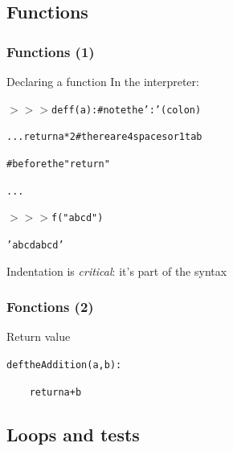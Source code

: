 \documentclass[xcolor=pdftex,dvipsnames,table,mathserif]{beamer}
\begin{document}
\subsection{Functions}

\begin{frame}
  \frametitle{Functions (1)}

  \begin{block}{Declaring a function}
    In the interpreter:
    \begin{alltt}
      $>>>$ def f(a):        \# note the ':' (colon)

      ...     return a*2   \# there are 4 spaces or 1 tab

      \#     before the "return"

      ...

      $>>>$ f("abcd")

      'abcdabcd'

    \end{alltt}
    Indentation is \emph{critical}: it's part of the syntax
  \end{block}

\end{frame}

\begin{frame}
  \frametitle{Fonctions (2)}
  \begin{block}{Return value}

    \begin{alltt}
      def theAddition( a , b ):

      ~~~~ return a + b
    \end{alltt}

  \end{block}
\end{frame}

\subsection{Loops and tests}
\end{document}
